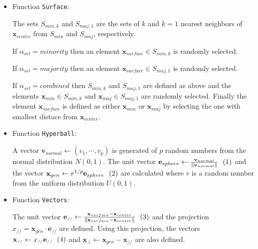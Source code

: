 \documentclass[parskip=full]{scrartcl}
\newcommand{\inlineeqnum}{\refstepcounter{equation}~~\mbox{(\theequation)}}
\begin{document}
\begin{itemize}
	
	\renewcommand\labelitemi{--}
	
	\item Function \texttt{Surface}:
	
		The sets  \( S_{min, k} \) and \( S_{maj, 1} \) are the sets of \( k \)
		and \( k = 1 \) nearest neighbors of \( \textbf{x}_{center} \) from \(
		S_{min} \) and \( S_{maj} \), respectively.
	
		If \( \alpha_{sel} = minority \) then an element \( \textbf{x}_{surface}
		\in S_{min, k}\) is randomly selected.
			
		If \( \alpha_{sel} = majority \) then an element \( \textbf{x}_{surface}
		\in S_{maj, 1}\) is randomly selected.
			
		If \( \alpha_{sel} = combined \) then \( S_{min, k} \) and \( S_{maj, 1}
		\) are defined as above and the elements \( \textbf{x}_{min} \in S_{min,
		k}\) and  \( \textbf{x}_{maj} \in S_{maj, 1}\) are randomly selected.
		Finally the element \( \textbf{x}_{surface} \) is defined as either \(
		\textbf{x}_{min} \) or \( \textbf{x}_{maj} \) by selecting the one with
		smallest distace from \( \textbf{x}_{center} \).
			
	
	\item Function \texttt{Hyperball}:
		
		A vector \( \textbf{v}_{normal} \leftarrow (v_{1}, \cdots, v_{p}) \) is
		generated of \( p \) random numbers from the normal distribution \( N(0,
		1) \). The unit vector \( \textbf{e}_{sphere} \leftarrow
		\frac{\textbf{v}_{normal}}{ \|\textbf{v}_{normal} \|}
		\inlineeqnum\label{eqn:sphere} \) and the vector \( \textbf{x}_{gen}
		\leftarrow r^{1 / p} \textbf{e}_{sphere} \inlineeqnum\label{eqn:ball} \)
		are calculated where \( r \) is a random number from the uniform
		distribution \( U(0, 1) \).
			
	\item Function \texttt{Vectors}:
	
		The unit vector \( \textbf{e}_{\scriptscriptstyle//} \leftarrow
		\frac{\textbf{x}_{surface} - \textbf{x}_{center}}{
		\|\textbf{x}_{surface} - \textbf{x}_{center} \|}
		\inlineeqnum\label{eqn:unit} \) and the projection  \(
		x_{\scriptscriptstyle//} = \textbf{x}_{gen} \cdot
		\textbf{e}_{\scriptscriptstyle//} \)  are defined. Using this
		projection, the vectors \( \textbf{x}_{\scriptscriptstyle//} \leftarrow
		x_{\scriptscriptstyle//} \textbf{e}_{\scriptscriptstyle//}
		\inlineeqnum\label{eqn:parallel} \) and \( \textbf{x}_{\bot} \leftarrow
		\textbf{x}_{gen} - \textbf{x}_{\scriptscriptstyle//} \) are also
		defined.
	 		

\end{itemize}
\end{document}
